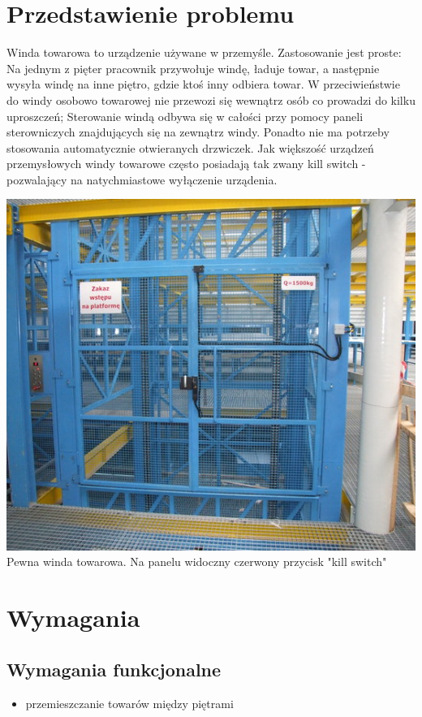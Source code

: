 \documentclass[a4paper,11pt]{article}
\begin{document}
\section{Przedstawienie problemu}

    Winda towarowa to urządzenie używane w przemyśle. Zastosowanie jest proste: Na jednym z pięter pracownik
    przywołuje windę, ładuje towar, a następnie wysyła windę na inne piętro, gdzie ktoś inny odbiera towar.
    W przeciwieństwie do windy osobowo towarowej nie przewozi się  wewnątrz osób co prowadzi do kilku uproszczeń;
    Sterowanie windą odbywa się w całości przy pomocy paneli sterowniczych znajdujących się na zewnątrz windy. 
    Ponadto nie ma potrzeby stosowania automatycznie otwieranych drzwiczek. Jak większość urządzeń przemysłowych 
    windy towarowe często posiadają tak zwany kill switch - pozwalający na natychmiastowe wyłączenie urządenia.
   
    \begin{center} 
    	\includegraphics{images/elevator.png} \\Pewna winda towarowa. Na panelu widoczny czerwony przycisk "kill switch"\\ 
    \end{center} 
    
\section{Wymagania}
    \subsection{Wymagania funkcjonalne}
    	\begin{itemize}
    		\item przemieszczanie towarów między piętrami
    	\end{itemize}
\end{document}
